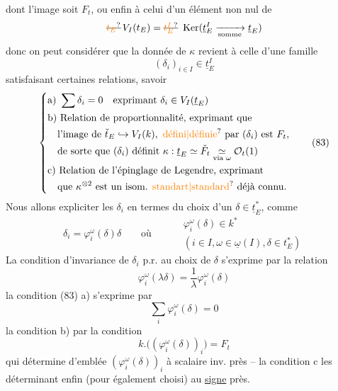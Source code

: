dont l'image soit $F_t$, ou enfin à celui d'un élément non nul de
\[
 \deleted{\unsure{t_E}}\,V_I(t_E)=\deleted{\unsure{t_E^I}}\ \operatorname{Ker}(\underline t_E^I\xrightarrow[\text{somme}]{}\underline t_E)
\]
donc on peut considérer que la donnée de $\kappa$ revient à celle d'une famille
\[
 (\delta_i)_{i\in I}\in\underline t_E^I \tag*{(82)}
\]
satisfaisant certaines relations, savoir
\[
 \left\{\begin{aligned}
 &\text{a) }\sum\delta_i=0\quad\text{exprimant }\delta_i\in V_I(\underline t_E)\\
 &\text{b) Relation de proportionnalité, exprimant que}\\
 &\quad\text{l'image de }\check t_E\hookrightarrow V_I(k),\ \text{\unsure{défini|définie} par }(\delta_i)\text{ est }F_t,\\
 &\quad\text{de sorte que }(\delta_i)\text{ définit }\kappa:\underline t_E\simeq\check F_t\underset{\text{via }\omega}{\simeq}\mathcal O_t(1)\\
 &\text{c) Relation de l'épinglage de Legendre, exprimant}\\
 &\quad\text{que }\kappa^{\otimes2}\text{ est un isom. }\text{\unsure{standart|standard}}\text{ déjà connu.}
 \end{aligned}\right. \tag*{(83)}
\]
Nous allons expliciter les $\delta_i$ en termes du choix d'un $\delta\in\underline t_E^*$,  comme
\[
 \delta_i=\varphi_i^\omega(\delta)\delta\qquad\text{où}\qquad
 \begin{aligned}&\varphi_i^\omega(\delta)\in k^*\\ &(i\in I,\omega\in\underline\omega(I),\delta\in t_E^*)\end{aligned} \tag*{(84)}
\]
La condition d'invariance de $\delta_i$ p.r. au choix de $\delta$ s'exprime par la relation
\[
 \varphi_i^\omega(\lambda\delta)=\frac1\lambda\varphi_i^\omega(\delta) \tag*{(85)}
\]
la condition (83) a) s'exprime par
\[
 \sum_i\varphi_i^\omega(\delta)=0 \tag*{(86)}
\]
la condition b) par la condition
\[
 k.\big((\varphi_i^\omega(\delta))_i\big)=F_t \tag*{(87)}
\]
qui détermine d'emblée  $(\varphi_i^\omega(\delta))_i$ à scalaire inv. près -- la condition c les déterminant enfin (pour  également choisi) au \uline{signe} près.

